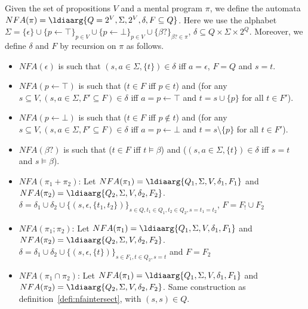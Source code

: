 \begin{defi}
    Given the set of propositions $V$ and a mental program $\pi$, we define the automata $NFA(\pi) = \ldiaarg{Q = 2^V, \Sigma, 2^V, \delta, F\subseteq Q}$. Here we use the alphabet
    $\Sigma = \{\epsilon\}\cup\{p\leftarrow\top\}_{p\in V}\cup\{p\leftarrow\bot\}_{p\in V}\cup\{\beta?\}_{\beta?\in\pi}$, $\delta\subseteq Q\times\Sigma\times 2^Q$.
    Moreover, we define $\delta$ and $F$ by recursion on $\pi$ as follows.
    \begin{itemize}
        \item $NFA(\epsilon)$ is such that $(s,a\in\Sigma,\{t\})\in\delta$ iff $a = \epsilon$, $F = Q$ and $s = t$.

        \item $NFA(p\leftarrow\top)$  is such that ($t\in F$ iff $p\in t$) and (for any $s\subseteq V, (s, a\in\Sigma, F'\subseteq F)\in \delta$ iff $a = p\leftarrow\top$ and $t = s\cup\{p\}$ for all $t\in F'$).

        \item $NFA(p\leftarrow\bot)$  is such that ($t\in F$ iff $p\notin t$) and (for any $s\subseteq V, (s, a\in\Sigma, F'\subseteq F)\in \delta$ iff $a = p\leftarrow\bot$ and $t = s\setminus\{p\}$ for all $t\in F'$).

        \item $NFA(\beta?)$ is such that ($t\in F$ iff $t\vDash\beta$) and  ($(s, a\in\Sigma, \{t\})\in\delta$ iff $s = t$ and $s\vDash\beta$).

        \item $NFA(\pi_1 + \pi_2)$: Let $NFA(\pi_1) = \ldiaarg{Q_1, \Sigma, V, \delta_1, F_1}$ and $NFA(\pi_2) = \ldiaarg{Q_2, \Sigma, V, \delta_2, F_2}$. $\delta = \delta_1\cup\delta_2\cup\{(s,\epsilon,\{t_1, t_2\})\}_{s\in Q, t_1\in Q_1, t_2\in Q_2, s = t_1 = t_2}$, $F = F_!\cup F_2$

        \item $NFA(\pi_1;\pi_2)$: Let $NFA(\pi_1) = \ldiaarg{Q_1, \Sigma, V, \delta_1, F_1}$ and $NFA(\pi_2) = \ldiaarg{Q_2, \Sigma, V, \delta_2, F_2}$. $\delta = \delta_1\cup\delta_2\cup\{(s,\epsilon,\{t\})\}_{s\in F_1, t\in Q_2, s = t}$ and $F = F_2$

        \item $NFA(\pi_1\cap\pi_2)$: Let $NFA(\pi_1) = \ldiaarg{Q_1, \Sigma, V, \delta_1, F_1}$ and $NFA(\pi_2) = \ldiaarg{Q_2, \Sigma, V, \delta_2, F_2}$. Same construction as definition~\ref{defi:nfaintersect}, with $(s, s)\in Q$.
    \end{itemize}
\end{defi}

